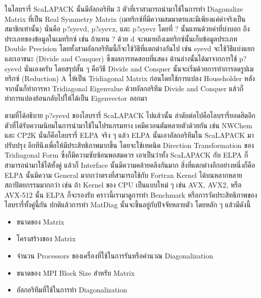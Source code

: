ในไลบรารี่ ScaLAPACK นั้นมีอัลกอริทึม 3 ตัวที่เราสามารถนำมาใช้ในการทำ Diagonalize Matrix ที่เป็น Real Symmetry Matrix 
(เมทริกซ์ที่มีความสมมาตรและมีเพียงแค่ค่าจริงเป็นสมาชิกเท่านั้น) นั่นคือ p?syevd, p?syevx, และ p?syevr โดยที่ ? นั้นแทนด้วยค่าที่บ่งบอก%
ถึงประเภทของข้อมูลในเมทริกซ์ เช่น ถ้าแทน ? ด้วย d จะหมายถึงเมทริกซ์นั้นเก็บข้อมูลประเภท Double Precision
โดยทั้งสามอัลกอริทึมนี้ก็จะใช้วิธีที่แตกต่างกันไป เช่น syevd จะใช้วิธีแบ่งแยกและเอาชนะ (Divide and Conquer) ซึ่งผลการทดสอบที่แสดง%
ด้านล่างนั้นได้มาจากการใช้ p?syevd นั่นเองครับ โดยสรุปสั้น ๆ คือวิธี Divide and Conquer นั้นจะเริ่มด้วยการทำการลดรูปเมทริกซ์ (Reduction) 
A ให้เป็น Tridiagonal Matrix ก่อนโดยใช้การแปลง Householder หลังจากนั้นก็ทำการหา Tridiagonal Eigenvalue ด้วยอัลกอริทึม 
Divide and Conquer แล้วก็ทำการแปลงย้อนกลับไปให้ได้เป็น Eigenvector ออกมา

ตามที่ได้อธิบาย p?syevd ของไลบรารี่ ScaLAPACK ไปแล้วนั้น ลำดับต่อไปคือไลบรารี่ยอดฮิตอีกตัวที่ได้รับความนิยมในการนำมาใช้ในโปรแกรมทาง%
เคมีควอนตัมหลายตัวด้วยกัน เช่น NWChem และ CP2K นั่นก็คือไลบรารี่ ELPA จริง ๆ แล้ว ELPA นั้นเอาอัลกอริทึมใน ScaLAPACK มาปรับปรุง%
อีกทีนึงเพื่อให้มีประสิทธิภาพมากขึ้น โดยจะใช้เทคนิค Direction Transformation ของ Tridiagonal Form ซึ่งก็มีความซับซ้อนพอสมควร 
เอาเป็นว่าทั้ง ScaLAPACK กับ ELPA ก็สามารถนำมาใช้ได้ทั้งคู่ แล้วก็ Interface นั้นมีความคล้ายคลึงกันมาก สิ่งที่แตกต่างอีกอย่างหนึ่งก็คือ ELPA 
นั้นมีความ General มากกว่าตรงที่สามารถใช้กับ Fortran Kernel ได้บนหลากหลายสถาปัตยกรรมมากกว่า เช่น ถ้า Kernel ของ CPU เป็นแบบใหม่ ๆ 
เช่น AVX, AVX2, หรือ AVX-512 นั้น ELPA ก็จะรองรับ คราวนี้เรามาดูการทำ Benchmark หรือการวัดประสิทธิภาพของไลบรารี่ทั้งคู่นี้กัน
ปกติแล้วการทำ MatDiag นั้นจะขึ้นอยู่กับปัจจัยหลายตัว โดยหลัก ๆ แล้วมีดังนี้

\begin{itemize}
    \item ขนาดของ Matrix
    
    \item โครงสร้างของ Matrix
    
    \item จำนวน Processors ของเครื่องที่ใช้ในการรันหรือคำนวณ Diagonalization
    
    \item ขนาดของ MPI Block Size สำหรับ Matrix
    
    \item อัลกอริทึมที่ใช้ในการทำ Diagonalization
\end{itemize}

